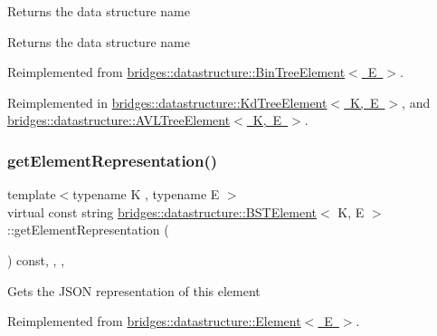 Returns the data structure name \begin{DoxyReturn}{Returns}
the data structure name 
\end{DoxyReturn}


Reimplemented from \mbox{\hyperlink{classbridges_1_1datastructure_1_1_bin_tree_element_aef86e3663785972251547e409fdc757b}{bridges\+::datastructure\+::\+Bin\+Tree\+Element$<$ E $>$}}.



Reimplemented in \mbox{\hyperlink{classbridges_1_1datastructure_1_1_kd_tree_element_a76f6d9bfadfdec09d0a8564aa0e33235}{bridges\+::datastructure\+::\+Kd\+Tree\+Element$<$ K, E $>$}}, and \mbox{\hyperlink{classbridges_1_1datastructure_1_1_a_v_l_tree_element_ab04d1e9ad4630e408041e8137dc9854a}{bridges\+::datastructure\+::\+A\+V\+L\+Tree\+Element$<$ K, E $>$}}.

\mbox{\label{classbridges_1_1datastructure_1_1_b_s_t_element_a8f962a01b6e0eff59abeee7768264fd9}} 
\subsubsection{\texorpdfstring{get\+Element\+Representation()}{getElementRepresentation()}}
{\footnotesize\ttfamily template$<$typename K , typename E $>$ \\
virtual const string \mbox{\hyperlink{classbridges_1_1datastructure_1_1_b_s_t_element}{bridges\+::datastructure\+::\+B\+S\+T\+Element}}$<$ K, E $>$\+::get\+Element\+Representation (\begin{DoxyParamCaption}{ }\end{DoxyParamCaption}) const\hspace{0.3cm}{\ttfamily [inline]}, {\ttfamily [override]}, {\ttfamily [protected]}, {\ttfamily [virtual]}}

Gets the J\+S\+ON representation of this element 

Reimplemented from \mbox{\hyperlink{classbridges_1_1datastructure_1_1_element_a285fc51d6dfcb8bff2d72f7e4addfe6d}{bridges\+::datastructure\+::\+Element$<$ E $>$}}.



